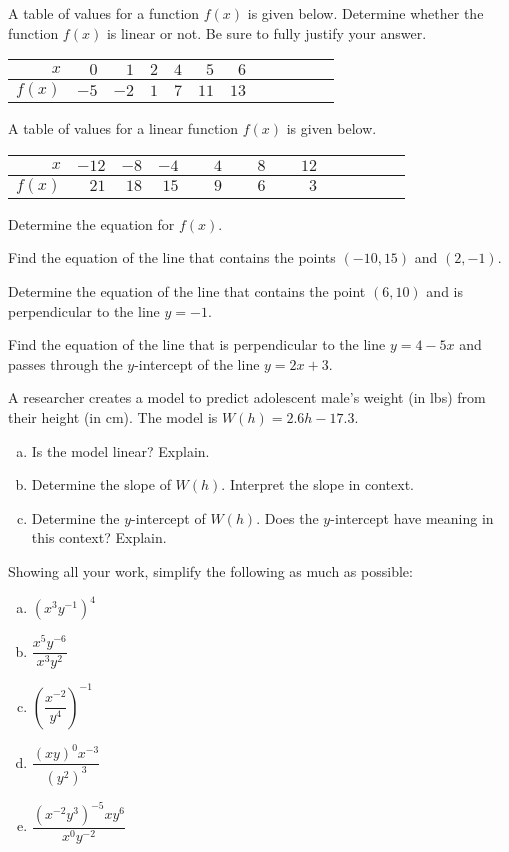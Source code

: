 \documentclass[11pt,letterpaper]{article}
\begin{document}
\prob A table of values for a function $f(x)$ is given below. Determine whether the function $f(x)$ is linear or not. Be sure to fully justify your answer. \par
	\begin{table}[H]
	\centering
	\begin{tabular}{r||rrrrrrrrrrr}
	$x$ & $0$ & $1$ & $2$ & $4$ & $5$ & $6$ \\ \hline
	$f(x)$ & $-5$ & $-2$ & $1$ & $7$ & $11$ & $13$
	\end{tabular}
	\end{table} \pspace


\prob A table of values for a linear function $f(x)$ is given below.
	\begin{table}[H]
	\centering
	\begin{tabular}{r||rrrrrrrrrrr}
	$x$ & $-12$ & $-8$ & $-4$ & $\phantom{-}4$ & $\phantom{-}8$ & $\phantom{-}12$ \\ \hline
	$f(x)$ & $21$ & $18$ & $15$ & $9$ & $6$ & $3$
	\end{tabular}
	\end{table} \par
Determine the equation for $f(x)$. \pspace


\prob Find the equation of the line that contains the points $(-10, 15)$ and $(2, -1)$. \pspace


\prob Determine the equation of the line that contains the point $(6, 10)$ and is perpendicular to the line $y= -1$. \pspace


\prob Find the equation of the line that is perpendicular to the line $y= 4 - 5x$ and passes through the $y$-intercept of the line $y= 2x + 3$. \pspace


\prob A researcher creates a model to predict adolescent male's weight (in lbs) from their height (in cm). The model is $W(h)= 2.6h - 17.3$.
	\begin{enumerate}[(a)]
	\item Is the model linear? Explain.
	\item Determine the slope of $W(h)$. Interpret the slope in context.
	\item Determine the $y$-intercept of $W(h)$. Does the $y$-intercept have meaning in this context? Explain.
	\end{enumerate}  \pspace


\prob Showing all your work, simplify the following as much as possible:
\begin{enumerate}[(a)]
\item $(x^3 y^{-1})^4$
\item $\dfrac{x^5y^{-6}}{x^3y^2}$
\item $\left( \dfrac{x^{-2}}{y^4} \right)^{-1}$
\item $\dfrac{(xy)^0 x^{-3}}{(y^2)^3}$
\item $\dfrac{(x^{-2} y^3)^{-5} xy^6}{x^0 y^{-2}}$
\end{enumerate} \pspace
\end{document}
